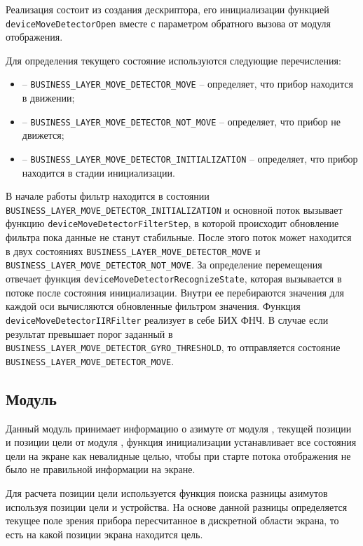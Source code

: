 Реализация состоит из создания дескриптора, его инициализации функцией \lstinline{deviceMoveDetectorOpen} вместе с параметром обратного вызова от модуля
отображения.

Для определения текущего состояние используются следующие перечисления:

\begin{itemize}
    \item -- \lstinline{BUSINESS_LAYER_MOVE_DETECTOR_MOVE} -- определяет, что прибор находится в движении;
    \item -- \lstinline{BUSINESS_LAYER_MOVE_DETECTOR_NOT_MOVE} -- определяет, что прибор не движется; 
    \item -- \lstinline{BUSINESS_LAYER_MOVE_DETECTOR_INITIALIZATION} -- определяет, что прибор находится в стадии инициализации.
\end{itemize}

В начале работы фильтр находится в состоянии \lstinline{BUSINESS_LAYER_MOVE_DETECTOR_INITIALIZATION} и основной поток вызывает функцию
\lstinline{deviceMoveDetectorFilterStep}, в которой происходит обновление фильтра пока данные не станут стабильные.
После этого поток может находится в двух состояниях \lstinline{BUSINESS_LAYER_MOVE_DETECTOR_MOVE} и \lstinline{BUSINESS_LAYER_MOVE_DETECTOR_NOT_MOVE}.
За определение перемещения отвечает функция \lstinline{deviceMoveDetectorRecognizeState}, которая вызывается в потоке после состояния инициализации.
Внутри ее перебираются значения для каждой оси вычисляются обновленные фильтром значения. Функция \lstinline{deviceMoveDetectorIIRFilter} реализует в себе
БИХ ФНЧ. В случае если результат превышает порог заданный в \lstinline{BUSINESS_LAYER_MOVE_DETECTOR_GYRO_THRESHOLD}, то отправляется состояние \lstinline{BUSINESS_LAYER_MOVE_DETECTOR_MOVE}.

\subsection{Модуль \moduleFindTarget}

Данный модуль принимает информацию о азимуте от модуля \moduleOrientationAzimuth, 
текущей позиции и позиции цели от модуля \moduleUart, функция инициализации устанавливает все состояния цели на экране как невалидные
целью, чтобы при старте потока отображения не было не правильной информации на экране. 

Для расчета позиции цели используется функция поиска разницы азимутов используя позиции цели и устройства. На основе данной разницы
определяется текущее поле зрения прибора пересчитанное в дискретной области экрана, то есть на какой позиции экрана находится цель.

